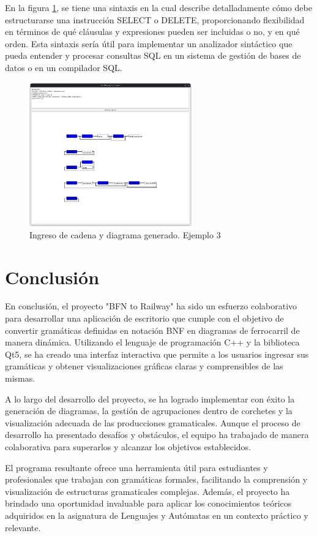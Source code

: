 \documentclass[conference]{IEEEtran}
\begin{document}
En la figura \ref{fig:ejemplo_3}, se tiene una sintaxis en la cual describe detalladamente cómo debe estructurarse una instrucción SELECT o DELETE, proporcionando flexibilidad en términos de qué cláusulas y expresiones pueden ser incluidas o no, y en qué orden. Esta sintaxis sería útil para implementar un analizador sintáctico que pueda entender y procesar consultas SQL en un sistema de gestión de bases de datos o en un compilador SQL.

\begin{figure} [H]
    \centering
    \includegraphics[width= 7cm]{imagen_4.png}
    \caption{Ingreso de cadena y diagrama generado. Ejemplo 3}
    \label{fig:ejemplo_3}
\end{figure}

\newpage
\section{Conclusión}
En conclusión, el proyecto "BFN to Railway" ha sido un esfuerzo colaborativo para desarrollar una aplicación de escritorio que cumple con el objetivo de convertir gramáticas definidas en notación BNF en diagramas de ferrocarril de manera dinámica. Utilizando el lenguaje de programación C++ y la biblioteca Qt5, se ha creado una interfaz interactiva que permite a los usuarios ingresar sus gramáticas y obtener visualizaciones gráficas claras y comprensibles de las mismas.

A lo largo del desarrollo del proyecto, se ha logrado implementar con éxito la generación de diagramas, la gestión de agrupaciones dentro de corchetes y la visualización adecuada de las producciones gramaticales. Aunque el proceso de desarrollo ha presentado desafíos y obstáculos, el equipo ha trabajado de manera colaborativa para superarlos y alcanzar los objetivos establecidos.

El programa resultante ofrece una herramienta útil para estudiantes y profesionales que trabajan con gramáticas formales, facilitando la comprensión y visualización de estructuras gramaticales complejas. Además, el proyecto ha brindado una oportunidad invaluable para aplicar los conocimientos teóricos adquiridos en la asignatura de Lenguajes y Autómatas en un contexto práctico y relevante.
\newpage
{} 
\printbibliography
\end{document}
